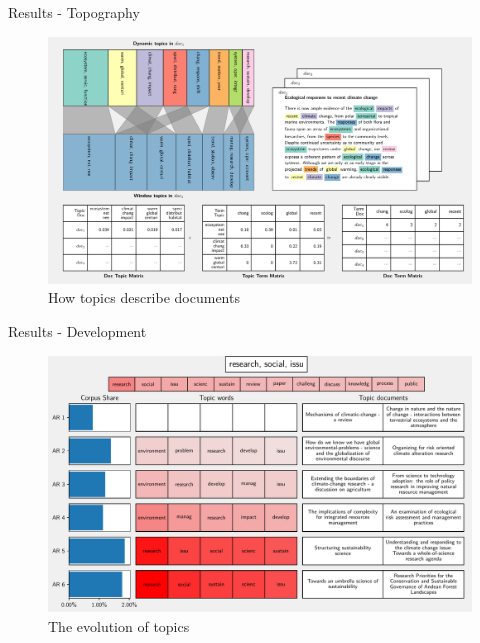 \documentclass[9pt]{beamer}
\begin{document}
\begin{frame}{Results - Topography}

	\begin{figure}	
		\includegraphics[width=\linewidth]{../plots/single_doc_3_536594.pdf}
		\caption{How topics describe documents}
	\end{figure}

\end{frame}

\begin{frame}{Results - Development}

\begin{figure}	
	\includegraphics[width=\linewidth]{../plots/single_topic_3_11046.pdf}
	\caption{The evolution of topics}
\end{figure}

\end{frame}
\end{document}
